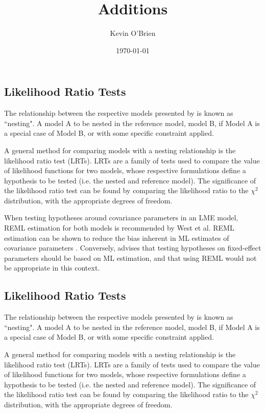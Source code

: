 \documentclass[12pt, a4paper]{report}
\begin{document}
\author{Kevin O'Brien}
\title{Additions}
\date{\today}
\maketitle

\tableofcontents \setcounter{tocdepth}{2}
\newpage
\subsection{Likelihood Ratio Tests}
The relationship between the respective models presented by \citet{roy} is known as ``nesting".
A model A to be nested in the reference model, model B, if Model A is a special case of Model B, or with some specific constraint applied.

A general method for comparing models with a nesting relationship is the likelihood ratio test (LRTs). LRTs are a family of tests used to compare the value of likelihood functions for two models, whose respective formulations define a hypothesis to be tested (i.e. the nested and reference model). The significance of the likelihood ratio test can be found by comparing the likelihood ratio to the $\chi^2$ distribution, with the appropriate degrees of freedom.

When testing hypotheses around covariance parameters in an LME model, REML estimation for both models is recommended by West et al. REML estimation can be shown to reduce the bias inherent in ML estimates of covariance parameters \citep{west}. Conversely, \citet{pb} advises that testing hypotheses on fixed-effect parameters should be based on ML estimation, and that using REML would not be appropriate in this context.





\newpage
\subsection{Likelihood Ratio Tests}
The relationship between the respective models presented by \citet{roy} is known as ``nesting".
A model A to be nested in the reference model, model B, if Model A is a special case of Model B, or with some specific constraint applied.

A general method for comparing models with a nesting relationship is the likelihood ratio test (LRTs). LRTs are a family of tests used to compare the value of likelihood functions for two models, whose respective formulations define a hypothesis to be tested (i.e. the nested and reference model). The significance of the likelihood ratio test can be found by comparing the likelihood ratio to the $\chi^2$ distribution, with the appropriate degrees of freedom.
\end{document}
